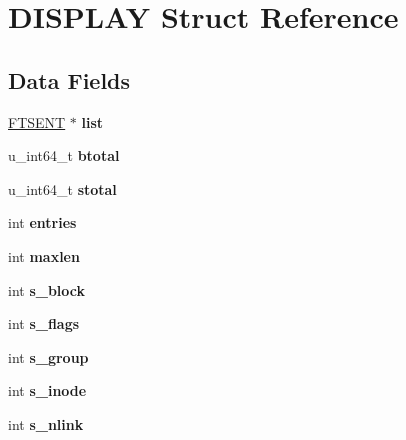 \hypertarget{structDISPLAY}{}\section{D\+I\+S\+P\+L\+AY Struct Reference}
\label{structDISPLAY}
\subsection*{Data Fields}
\begin{DoxyCompactItemize}
\item 
\mbox{\label{structDISPLAY_ab0cb3c9834a69d5eedd3708f460ebad8}} 
\mbox{\hyperlink{struct__ftsent}{F\+T\+S\+E\+NT}} $\ast$ {\bfseries list}
\item 
\mbox{\label{structDISPLAY_a2763bb02d469bdbade82be6e62a79fe4}} 
u\+\_\+int64\+\_\+t {\bfseries btotal}
\item 
\mbox{\label{structDISPLAY_a33a7b3189a5954ed1bdbc55a14fa7b55}} 
u\+\_\+int64\+\_\+t {\bfseries stotal}
\item 
\mbox{\label{structDISPLAY_a0ecfd3b7eae264ff43f96286663b20ef}} 
int {\bfseries entries}
\item 
\mbox{\label{structDISPLAY_a73d82209cb2ac5ec0a64694068a52db6}} 
int {\bfseries maxlen}
\item 
\mbox{\label{structDISPLAY_a48f832d3d6837c4e37acc14774fc2018}} 
int {\bfseries s\+\_\+block}
\item 
\mbox{\label{structDISPLAY_a855bba2f3e858a768a1de6ad384e7811}} 
int {\bfseries s\+\_\+flags}
\item 
\mbox{\label{structDISPLAY_a1519635cc72c5adf852a6d6713385a2e}} 
int {\bfseries s\+\_\+group}
\item 
\mbox{\label{structDISPLAY_a9c84ca728d053a12e27d9a76b94f2816}} 
int {\bfseries s\+\_\+inode}
\item 
\mbox{\label{structDISPLAY_a15086058eeff0bfab4fef0afdea6302d}} 
int {\bfseries s\+\_\+nlink}
\item 

\end{DoxyCompactItemize}
